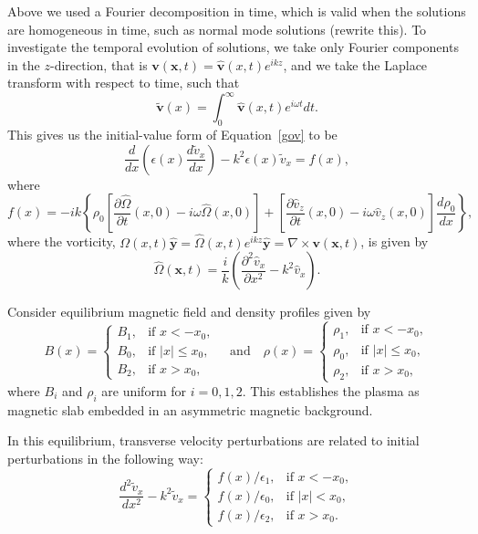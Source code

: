 \documentclass{aastex61}
\begin{document}
Above we used a Fourier decomposition in time, which is valid when the solutions are homogeneous in time, such as normal mode solutions (rewrite this). To investigate the temporal evolution of solutions, we take only Fourier components in the $z$-direction, that is $\mathbf{v}(\mathbf{x},t) = \mathbf{\hat{v}}(x,t)e^{ikz}$, and we take the Laplace transform with respect to time, such that
\begin{equation}
\mathbf{\tilde{v}}(x) = \int_0^\infty \mathbf{\widehat{v}}(x,t)e^{i\omega t} dt.
\end{equation}
This gives us the initial-value form of Equation~\eqref{gov} to be
\begin{equation}
\frac{d}{dx}\left(\epsilon(x) \frac{d\tilde{v}_x}{dx}\right) - k^2\epsilon(x)\tilde{v}_x = f(x),
\label{ivp gov}
\end{equation}
where
\begin{equation}
f(x) = -ik\left\{\rho_0\left[\frac{\partial\hat{\Omega}}{\partial t}(x,0) - i\omega\hat{\Omega}(x,0)\right] + \left[\frac{\partial\hat{v}_z}{\partial t}(x,0) - i\omega \hat{v}_z(x,0)\right]\frac{d\rho_0}{dx}\right\},
\label{f}
\end{equation}
where the vorticity, $\Omega(x,t)\mathbf{\hat{y}} = \hat{\Omega}(x,t)e^{ikz}\mathbf{\hat{y}} = \nabla \times \mathbf{v}(\mathbf{x},t)$, is given by
\begin{equation}
\hat{\Omega}(\mathbf{x},t) = \frac{i}{k}\left(\frac{\partial^2\hat{v}_x}{\partial x^2} - k^2 \hat{v}_x\right).
\end{equation}

Consider equilibrium magnetic field and density profiles given by
\begin{equation}
B(x)=
\begin{cases}
B_1, & \text{if  }x<-x_0, \\
B_0, & \text{if }|x|\leq{x_0}, \\
B_2, & \text{if  }x>x_0,
\end{cases}
\quad \text{and} \quad
\rho(x)=
\begin{cases}
\rho_1, & \text{if  }x<-x_0, \\
\rho_0, & \text{if }|x|\leq{x_0}, \\
\rho_2, & \text{if  }x>x_0,
\end{cases}
\end{equation}
where $B_i$ and $\rho_i$ are uniform for $i = 0,1,2$. This establishes the plasma as magnetic slab embedded in an asymmetric magnetic background.

In this equilibrium, transverse velocity perturbations are related to initial perturbations in the following way:
\begin{equation}
\frac{d^2\tilde{v}_x}{dx^2} - k^2\tilde{v}_x = 
\begin{cases}
f(x)/\epsilon_1, & \text{if  } x<-x_0,\\
f(x)/\epsilon_0, & \text{if  } |x|<x_0,\\
f(x)/\epsilon_2, & \text{if  } x>x_0.
\end{cases}
\label{ivp gov slab}
\end{equation}
\end{document}
